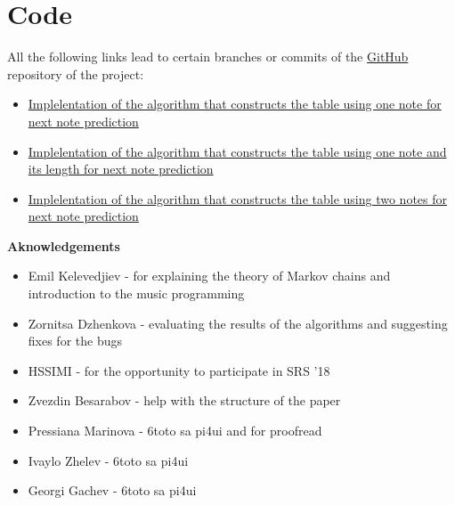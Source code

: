 \documentclass[]{article}
\begin{document}
    \section{Code}
        All the following links lead to certain branches or commits of the \href{https://github.com}{GitHub} repository of the project:
        \begin{itemize}
            \item \href{https://github.com/Ro6afF/compmus/tree/0cf9173a547a9effdc720dc6f6ac8ad551cd2fa4}{Implelentation of the algorithm that constructs the table using one note for next note prediction}
            \item \href{https://github.com/Ro6afF/compmus/tree/One_note_with_time}{Implelentation of the algorithm that constructs the table using one note and its length for next note prediction}
            \item \href{https://github.com/Ro6afF/compmus/tree/72fbc777ef7371ac7810d87d306ba3a2e8267121}{Implelentation of the algorithm that constructs the table using two notes for next note prediction}
        \end{itemize}
        \newpage
    {\large{\textbf{Aknowledgements}}}
    \begin{itemize}
        \item Emil Kelevedjiev - for explaining the theory of Markov chains and introduction to the music programming
        \item Zornitsa Dzhenkova - evaluating the results of the algorithms and suggesting fixes for the bugs
        \item HSSIMI - for the opportunity to participate in SRS '18
        \item Zvezdin Besarabov - help with the structure of the paper
        \item Pressiana Marinova - 6toto sa pi4ui and for proofread
        \item Ivaylo Zhelev - 6toto sa pi4ui
        \item Georgi Gachev - 6toto sa pi4ui
    {}
    

    \end{itemize}
\end{document}
